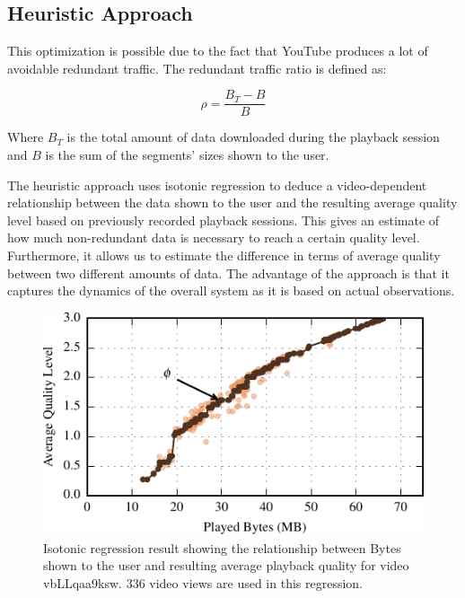 
\subsection{Heuristic Approach}
\label{sec:heu}

This optimization is possible due to the fact that YouTube produces a lot of avoidable redundant traffic. The redundant traffic ratio is defined as:

\begin{equation}
	\rho = \frac{B_T-B}{B}
\end{equation}

Where $B_T$ is the total amount of data downloaded during the playback session and $B$ is the sum of the segments' sizes shown to the user.


The heuristic approach uses isotonic regression \cite{barlow1972statistical} to deduce a video-dependent relationship between the data shown to the user and the resulting average quality level based on previously recorded playback sessions.
This gives an estimate of how much non-redundant data is necessary to reach a certain quality level.
Furthermore, it allows us to estimate the difference in terms of average quality between two different amounts of data.
The advantage of the approach is that it captures the dynamics of the overall system as it is based on actual observations.

\begin{figure}[t]
\centering
\includegraphics[width=\columnwidth]{figs/32_vbLLqaa9ksw.pdf}%
\caption{Isotonic regression result showing the relationship between Bytes shown to the user and resulting average playback quality for video vbLLqaa9ksw. $336$ video views are used in this regression.}
\label{fig:heuristic}%
\end{figure}

